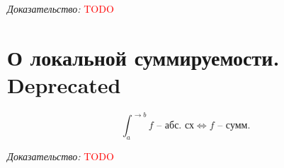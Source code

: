 \documentclass[paper=a4, fontsize=17pt]{article}
\begin{document}
\emph{Доказательство:} \textcolor{red}{TODO}

\section{О локальной суммируемости. \Large Deprecated}
$$ \int_{a}^{\rightarrow b} f \text{ -- абс. сх} \Longleftrightarrow f \text{ -- сумм.}$$

\emph{Доказательство:} \textcolor{red}{TODO}
\end{document}
